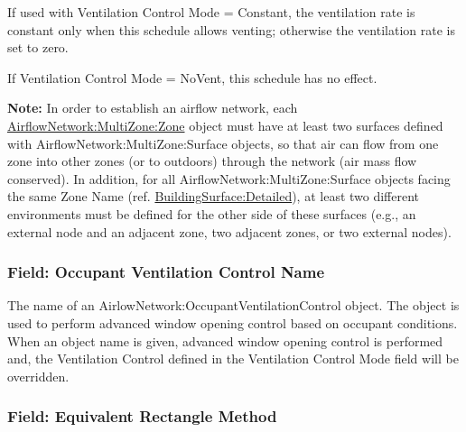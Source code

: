 If used with Ventilation Control Mode = Constant, the ventilation rate is constant only when this schedule allows venting; otherwise the ventilation rate is set to zero.

If Ventilation Control Mode = NoVent, this schedule has no effect.

\textbf{Note:} In order to establish an airflow network, each \hyperref[airflownetworkmultizonezone]{AirflowNetwork:MultiZone:Zone} object must have at least two surfaces defined with AirflowNetwork:MultiZone:Surface objects, so that air can flow from one zone into other zones (or to outdoors) through the network (air mass flow conserved). In addition, for all AirflowNetwork:MultiZone:Surface objects facing the same Zone Name (ref. \hyperref[buildingsurfacedetailed]{BuildingSurface:Detailed}), at least two different environments must be defined for the other side of these surfaces (e.g., an external node and an adjacent zone, two adjacent zones, or two external nodes).

\subsubsection{Field: Occupant Ventilation Control Name}\label{field-occupant-ventilation-control-name-1}

The name of an AirlowNetwork:OccupantVentilationControl object. The object is used to perform advanced window opening control based on occupant conditions. When an object name is given, advanced window opening control is performed and, the Ventilation Control defined in the Ventilation Control Mode field will be overridden.

\subsubsection{Field: Equivalent Rectangle Method }\label{equivalent-rectangle-method}

